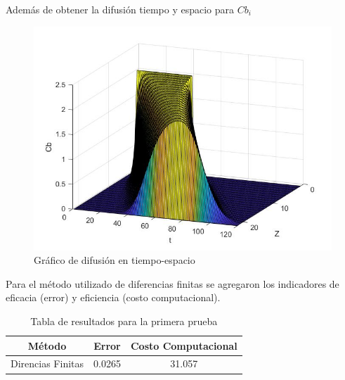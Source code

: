 \newpage

\par Además de obtener la difusión tiempo y espacio para $Cb_{i}$

\begin{figure}[!ht]
	\centering
	\includegraphics[scale=0.6]{Imagenes/grafico3d2.jpg}
	\caption{Gráfico de difusión en tiempo-espacio}
	\label{fig:ej}
\end{figure} 

\par Para el método utilizado de diferencias finitas se agregaron los indicadores de eficacia (error) y eficiencia (costo computacional).

\begin{table}[htp]
	\centering
	\begin{tabular}{ |c|c|c|}
		\hline
		\textbf{Método} & \textbf{Error} & \textbf{Costo Computacional}  \\
		\hline
		Direncias Finitas & 0.0265 &  31.057 \\
		\hline
	\end{tabular}
	\caption{Tabla de resultados para la primera prueba}
	\label{tab:tab3}
\end{table}



















